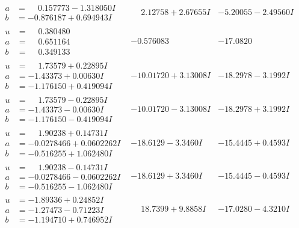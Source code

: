 \documentclass[1p]{elsarticle_modified}
\theoremstyle{definition}
\begin{document}
$$\begin{array}{c|c|c}
\begin{aligned}
a &= \phantom{-}0.157773 - 1.318050 I \\
b &= -0.876187 + 0.694943 I\end{aligned}
 & \phantom{-}2.12758 + 2.67655 I & -5.20055 - 2.49560 I \\ \hline\begin{aligned}
u &= \phantom{-}0.380480\phantom{ +0.000000I} \\
a &= \phantom{-}0.651164\phantom{ +0.000000I} \\
b &= \phantom{-}0.349133\phantom{ +0.000000I}\end{aligned}
 & -0.576083\phantom{ +0.000000I} & -17.0820\phantom{ +0.000000I} \\ \hline\begin{aligned}
u &= \phantom{-}1.73579 + 0.22895 I \\
a &= -1.43373 + 0.00630 I \\
b &= -1.176150 + 0.419094 I\end{aligned}
 & -10.01720 + 3.13008 I & -18.2978 - 3.1992 I \\ \hline\begin{aligned}
u &= \phantom{-}1.73579 - 0.22895 I \\
a &= -1.43373 - 0.00630 I \\
b &= -1.176150 - 0.419094 I\end{aligned}
 & -10.01720 - 3.13008 I & -18.2978 + 3.1992 I \\ \hline\begin{aligned}
u &= \phantom{-}1.90238 + 0.14731 I \\
a &= -0.0278466 + 0.0602262 I \\
b &= -0.516255 + 1.062480 I\end{aligned}
 & -18.6129 - 3.3460 I & -15.4445 + 0.4593 I \\ \hline\begin{aligned}
u &= \phantom{-}1.90238 - 0.14731 I \\
a &= -0.0278466 - 0.0602262 I \\
b &= -0.516255 - 1.062480 I\end{aligned}
 & -18.6129 + 3.3460 I & -15.4445 - 0.4593 I \\ \hline\begin{aligned}
u &= -1.89336 + 0.24852 I \\
a &= -1.27473 - 0.71223 I \\
b &= -1.194710 + 0.746952 I\end{aligned}
 & \phantom{-}18.7399 + 9.8858 I & -17.0280 - 4.3210 I \\ \hline\begin{aligned}

\end{aligned}
\end{array}$$
\end{document}
